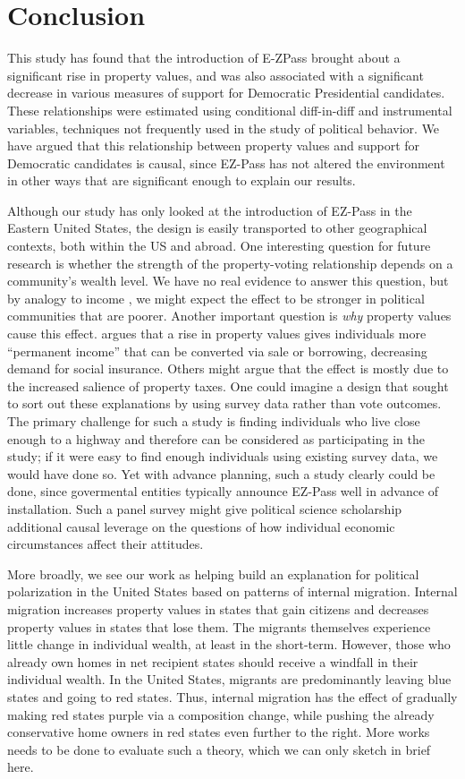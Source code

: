 \section{Conclusion}
This study has found that the introduction of E-ZPass brought about a significant rise in property values, and was also associated with a significant decrease in various measures of support for Democratic Presidential candidates. These relationships were estimated using conditional diff-in-diff and instrumental variables, techniques not frequently used in the study of political behavior. We have argued that this relationship between property values and support for Democratic candidates is causal, since EZ-Pass has not altered the environment in other ways that are significant enough to explain our results. 

Although our study has only looked at the introduction of EZ-Pass in the Eastern United States, the design is easily transported to other geographical contexts, both within the US and abroad. One interesting question for future research is whether the strength of the property-voting relationship depends on a community's wealth level. We have no real evidence to answer this question, but by analogy to income \parencite{Gelman2007}, we might expect the effect to be stronger in political communities that are poorer. Another important question is \emph{why} property values cause this effect. \textcite{Ansell2014} argues that a rise in property values gives individuals more ``permanent  income'' that can be converted via sale or borrowing, decreasing demand for social insurance. Others might argue that the effect is mostly due to the increased salience of property taxes. One could imagine a design that sought to sort out these explanations by using survey data rather than vote outcomes. The primary challenge for such a study is finding individuals who live close enough to a highway and therefore can be considered as participating in the study; if it were easy to find enough individuals using existing survey data, we would have done so. Yet with advance planning, such a study clearly could be done, since govermental entities typically announce EZ-Pass well in advance of installation. Such a panel survey might give political science scholarship additional causal leverage on the questions of how individual economic circumstances affect their attitudes. 
 
More broadly, we see our work as helping build an explanation for political polarization in the United States based on patterns of internal migration. Internal migration increases property values in states that gain citizens and decreases property values in states that lose them. The migrants themselves experience little change in individual wealth, at least in the short-term. However, those who already own homes in net recipient states should receive a windfall in their individual wealth. In the United States, migrants are predominantly leaving blue states and going to red states. Thus, internal migration has the effect of gradually making red states purple via a composition change, while pushing the already conservative home owners in red states even further to the right. More works needs to be done to evaluate such a theory, which we can only sketch in brief here. 

